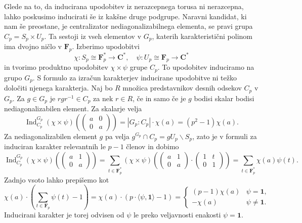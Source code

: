 \documentclass[11pt]{book}
\def\CC{\mathbf{C}}
\def\11{\mathbf{1}}
\def\FF{\mathbf{F}}
\DeclareMathOperator\Ind{Ind}
\theoremstyle{definition}
\theoremstyle{zgled}
\theoremstyle{odprtproblem}
\theoremstyle{domacanaloga}
\theoremstyle{izrek}
\begin{document}
Glede na to, da inducirana upodobitev iz nerazcepnega torusa ni nerazcepna, lahko poskusimo inducirati še iz kakšne druge podgrupe. Naravni kandidat, ki nam še preostane, je centralizator nediagonalizabilnega elementa, se pravi grupa $C_p = S_p \times U_p$. Ta sestoji iz vseh elementov v $G_p$, katerih karakteristični polinom ima dvojno ničlo v $\FF_p$. Izberimo upodobitvi
\[
    \chi \colon S_p \cong \FF_p^* \to \CC^*, \quad
    \psi \colon U_p \cong \FF_p \to \CC^*
\]
in tvorimo produktno upodobitev $\chi \times \psi$ grupe $C_p$. To upodobitev induciramo na grupo $G_p$. S formulo za izračun karakterjev inducirane upodobitve ni težko določiti njenega karakterja. Naj bo $R$ množica predstavnikov desnih odsekov $C_p$ v $G_p$. Za $g \in G_p$ je $r g r^{-1} \in C_p$ za nek $r \in R$, če in samo če je $g$ bodisi skalar bodisi nediagonalizabilen element. Za skalarje velja
\[
    {\textstyle \Ind_{C_p}^{G_p}(\chi \times \psi) } \left( \begin{pmatrix} a & 0 \\ 0 & a \end{pmatrix} \right)
    = |G_p : C_p| \cdot \chi(a) = (p^2 - 1) \chi(a).
\]
Za nediagonalizabilen element $g$ pa velja $g^{G_p} \cap C_p = g U_p \backslash S_p$, zato je v formuli za induciran karakter relevantnih le $p-1$ členov in dobimo
\[
    {\textstyle \Ind_{C_p}^{G_p}(\chi \times \psi)} \left( \begin{pmatrix} a & 1 \\ 0 & a \end{pmatrix} \right)
    = \sum_{t \in \FF_p^*} (\chi \times \psi) \left( \begin{pmatrix} a & 1 \\ 0 & a \end{pmatrix} \cdot \begin{pmatrix} 1 & t \\ 0 & 1 \end{pmatrix} \right)
    = \sum_{t \in \FF_p^*} \chi(a) \psi(t).
\]
Zadnjo vsoto lahko prepišemo kot
\[
    \chi(a) \cdot \left( \sum_{t \in \FF_p} \psi(t) - 1 \right)
    = \chi(a) \cdot \left( p \cdot \langle \psi, \11 \rangle - 1 \right)
    = \begin{cases}
        (p-1) \chi(a) & \psi = \11, \\
        - \chi(a) & \psi \neq \11.
    \end{cases}
\]
Inducirani karakter je torej odvisen od $\psi$ le preko veljavnosti enakosti $\psi = \11$.
\end{document}
